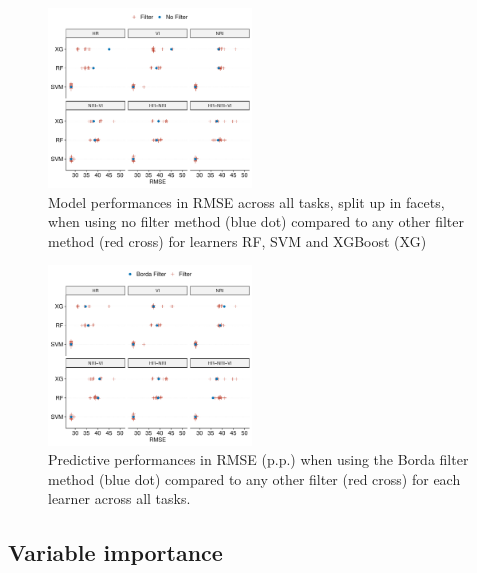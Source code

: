 \documentclass[final]{IEEEtran}
\begin{document}
\begin{figure} [t!]
	\centering
	\begin{center}
		\includegraphics[width=0.48\textwidth] {filter-effect-all-vs-no-filter-1.pdf}
		\caption{Model performances in RMSE across all tasks, split up in facets, when using no filter method (blue dot) compared to any other filter method (red cross) for learners RF, SVM and XGBoost (XG)}\label{fig:filter-effects-no-filter}
	\end{center}
\end{figure}

\begin{figure} [t!]
	\centering
	\begin{center}
		\includegraphics[width=0.48\textwidth] {filter-effect-all-vs-borda-filter-1.pdf}
		\caption{Predictive performances in RMSE (p.p.) when using the Borda filter method (blue dot) compared to any other filter (red cross) for each learner across all tasks.}\label{fig:filter-effects-borda}
	\end{center}
\end{figure}

\subsection{Variable importance}
\end{document}
